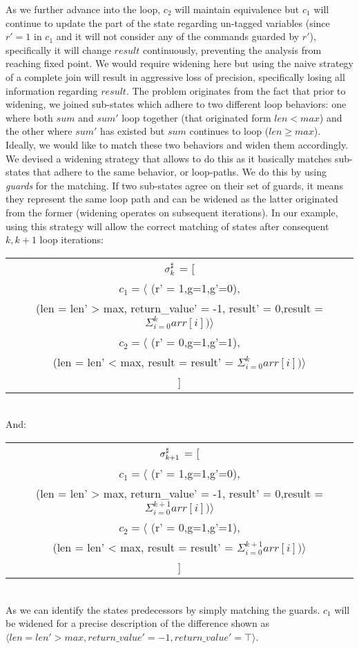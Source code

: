As we further advance into the loop, $c_2$ will maintain equivalence but $c_1$ will continue to update the part of the state regarding un-tagged variables  (since $r'=1$ in $c_1$ and it will not consider any of the commands guarded by $r'$), specifically it will change $result$ continuously, preventing the analysis from reaching fixed point. We would require widening here but using the naive strategy of a complete join will result in aggressive loss of precision, specifically losing all information regarding $result$. The problem originates from the fact that prior to widening, we joined sub-states which adhere to two different loop behaviors: one where both $sum$ and $sum'$ loop together (that originated form $len < max$) and the other where $sum'$ has existed but $sum$ continues to loop ($len \geq max$). Ideally, we would like to match these two behaviors and widen them accordingly. We devised a widening strategy that allows to do this as it basically matches sub-states that adhere to the same behavior, or loop-paths. We do this by using \emph{guards} for the matching. If two sub-states agree on their set of guards, it means they represent the same loop path and can be widened as the latter originated from the former (widening operates on subsequent iterations). In our example, using this strategy will allow the correct matching of states after consequent $k, k+1$ loop iterations:
\\
\begin{tabular}{c}
$\sigma^\sharp_{k}$ = [
\\
$c_1 = \langle$ (r' = 1,g=1,g'=0),
\\
(len = len' > max, return\_value' = -1,
 result' = 0,result = $\Sigma_{i=0}^{k} arr[i]) \rangle$
\\
$c_2 = \langle$ (r' = 0,g=1,g'=1),
\\
(len = len' < max, result = result' = $\Sigma_{i=0}^{k} arr[i]) \rangle$
\\
]
\end{tabular}
\\
And:
\\
\begin{tabular}{c}
$\sigma^\sharp_{k+1}$ = [
\\
$c_1 = \langle$ (r' = 1,g=1,g'=0),
\\
(len = len' > max, return\_value' = -1, 
 result' = 0,result = $\Sigma_{i=0}^{k+1} arr[i]) \rangle$
\\
$c_2 = \langle$ (r' = 0,g=1,g'=1),
\\
(len = len' < max, result = result' = $\Sigma_{i=0}^{k+1} arr[i]) \rangle$
\\
]
\end{tabular}
\\
As we can identify the states predecessors by simply matching the guards. $c_1$ will be widened for a precise description of the difference shown as $\langle len = len' > max, return\_value' = -1, return\_value' = \top \rangle$.

